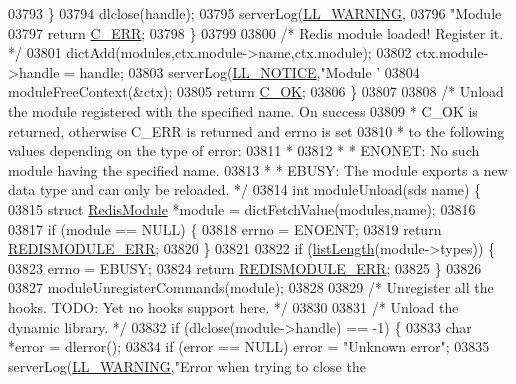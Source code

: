 \begin{DoxyCode}
{{{{{{{{{{{{{{03793         \}
03794         dlclose(handle);
03795         serverLog(\hyperlink{server_8h_a31229b9334bba7d6be2a72970967a14b}{LL\_WARNING},
03796             \textcolor{stringliteral}{"Module %
03797         \textcolor{keywordflow}{return} \hyperlink{server_8h_af98ac28d5f4d23d7ed5985188e6fb7d1}{C\_ERR};
03798     \}
03799 
03800     \textcolor{comment}{/* Redis module loaded! Register it. */}
03801     dictAdd(modules,ctx.module->name,ctx.module);
03802     ctx.module->handle = handle;
03803     serverLog(\hyperlink{server_8h_a8c54c191e436c7dd3012167212692401}{LL\_NOTICE},\textcolor{stringliteral}{"Module '%
03804     moduleFreeContext(&ctx);
03805     \textcolor{keywordflow}{return} \hyperlink{server_8h_a303769ef1065076e68731584e758d3e1}{C\_OK};
03806 \}
03807 
03808 \textcolor{comment}{/* Unload the module registered with the specified name. On success}
03809 \textcolor{comment}{ * C\_OK is returned, otherwise C\_ERR is returned and errno is set}
03810 \textcolor{comment}{ * to the following values depending on the type of error:}
03811 \textcolor{comment}{ *}
03812 \textcolor{comment}{ * * ENONET: No such module having the specified name.}
03813 \textcolor{comment}{ * * EBUSY: The module exports a new data type and can only be reloaded. */}
03814 \textcolor{keywordtype}{int} moduleUnload(sds name) \{
03815     \textcolor{keyword}{struct} \hyperlink{structRedisModule}{RedisModule} *module = dictFetchValue(modules,name);
03816 
03817     \textcolor{keywordflow}{if} (module == NULL) \{
03818         errno = ENOENT;
03819         \textcolor{keywordflow}{return} \hyperlink{redismodule_8h_a3df6f5bd5247289e66f44437a7cddd49}{REDISMODULE\_ERR};
03820     \}
03821 
03822     \textcolor{keywordflow}{if} (\hyperlink{adlist_8h_afde0ab079f934670e82119b43120e94b}{listLength}(module->types)) \{
03823         errno = EBUSY;
03824         \textcolor{keywordflow}{return} \hyperlink{redismodule_8h_a3df6f5bd5247289e66f44437a7cddd49}{REDISMODULE\_ERR};
03825     \}
03826 
03827     moduleUnregisterCommands(module);
03828 
03829     \textcolor{comment}{/* Unregister all the hooks. TODO: Yet no hooks support here. */}
03830 
03831     \textcolor{comment}{/* Unload the dynamic library. */}
03832     \textcolor{keywordflow}{if} (dlclose(module->handle) == -1) \{
03833         \textcolor{keywordtype}{char} *error = dlerror();
03834         \textcolor{keywordflow}{if} (error == NULL) error = \textcolor{stringliteral}{"Unknown error"};
03835         serverLog(\hyperlink{server_8h_a31229b9334bba7d6be2a72970967a14b}{LL\_WARNING},\textcolor{stringliteral}{"Error when trying to close the %
}}}}}}}}}}}}}}}}}
\end{DoxyCode}

